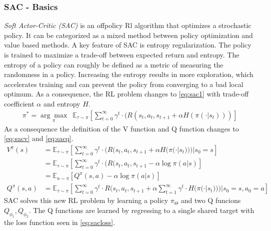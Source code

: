 \subsubsection{SAC - Basics}
\emph{Soft Actor-Critic (SAC)} \cite{haarnoja2018soft} is an offpolicy Rl algorithm that optimizes a strochastic policy. It can be categorized as a mixed method between policy optimization and value based methods.
A key feature of SAC is entropy regularization. The policy is trained to maximize a trade-off between expected return and entropy. 
The entropy of a policy can roughly be defined as a metric of measuring the randomness in a policy. Increasing the entropy results in more exploration, which accelerates training and can prevent the policy from converging to a bad local optimum.
As a consequence, the RL problem changes to \cref{eq:sac1} with trade-off coefficient $\alpha$ and entropy $H$.
\begin{align}
	\pi^* = \underset{\pi} {\arg \max} \enspace \mathbb{E}_{\tau \sim \pi} [\sum_{t = 0}^{\infty} \gamma^t \cdot 
	(R(s_t, a_t, s_{t+1} + \alpha H (\pi(\cdot | s_t)))] \label{eq:sac1}
\end{align}
As a consequence the definition of the V function and Q function changes to \cref{eq:sacv} and \cref{eq:sacq}.
\begin{align}
	V^{\pi}(s) &= \mathbb{E}_{\tau \sim \pi} [\sum_{t=0}^{\infty} \gamma^t \cdot (R(s_t, a_t, s_{t+1} + 
	\alpha H (\pi(\cdot |s_t))) | s_0 = s] \nonumber\\
	&= \mathbb{E}_{\tau \sim \pi} [\sum_{t=0}^{\infty} \gamma^t \cdot (R(s_t, a_t, s_{t+1} - \alpha \log \pi(a|s)]
	\nonumber \\
	&= \mathbb{E}_{a \sim \pi} [Q^{\pi} (s,a) - \alpha \log \pi(a|s) ]\label{eq:sacv}\\
	Q^{\pi} (s, a) &= 
	\mathbb{E}_{\tau \sim \pi} [\sum_{t=0}^{\infty} \gamma^t \cdot R(s_t, a_t, s_{t+1} + \alpha
	\sum_{t=1}^{\infty} \gamma^t \cdot H(\pi(\cdot | s_t))
	)|s_0 = s, a_0 = a]
	\label{eq:sacq}
\end{align}
SAC solves this new RL problem by learning a policy $\pi_{\Theta}$ and two Q funcions $Q_{\phi_1}, Q_{\phi_2}$.
The Q functions are learned by regressing to a single shared target with the loss function seen in \cref{eq:sacloss}.

